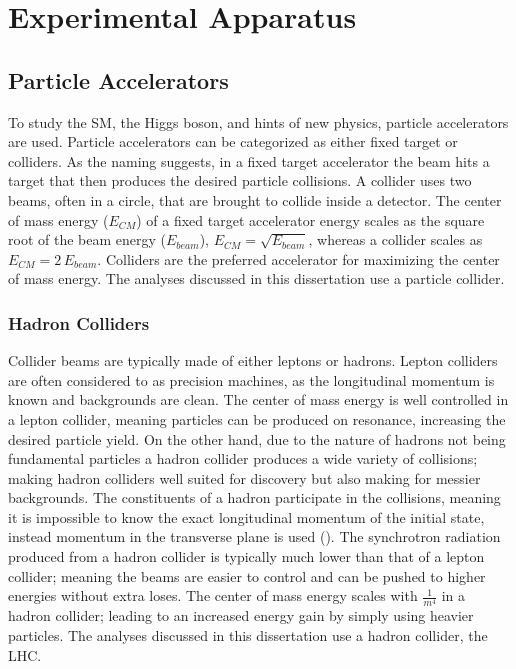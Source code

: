 \chapter{Experimental Apparatus}\label{chap:experiment}

\section{Particle Accelerators}\label{sec:accelerators}
	To study the \gls{SM}, the Higgs boson, and hints of new physics, particle accelerators are used. Particle accelerators can be categorized as either fixed target or colliders. As the naming suggests, in a fixed target accelerator the beam hits a target that then produces the desired particle collisions. A collider uses two beams, often in a circle, that are brought to collide inside a detector. The center of mass energy ($E_{CM}$) of a fixed target accelerator energy scales as the square root of the beam energy ($E_{beam}$), $E_{CM} = \sqrt{E_{beam}}$, whereas a collider scales as $E_{CM} = 2 \, E_{beam}$. Colliders are the preferred accelerator for maximizing the center of mass energy. The analyses discussed in this dissertation use a particle collider.

	\subsection{Hadron Colliders}\label{ssec:hadron-colliders}
		Collider beams are typically made of either leptons or hadrons. Lepton colliders are often considered to as precision machines, as the longitudinal momentum is known and backgrounds are clean. The center of mass energy is well controlled in a lepton collider, meaning particles can be produced on resonance, increasing the desired particle yield. On the other hand, due to the nature of hadrons not being fundamental particles a hadron collider produces a wide variety of collisions; making hadron colliders well suited for discovery but also making for messier backgrounds. The constituents of a hadron participate in the collisions, meaning it is impossible to know the exact longitudinal momentum of the initial state, instead momentum in the transverse plane is used (\pt). The synchrotron radiation produced from a hadron collider is typically much lower than that of a lepton collider; meaning the beams are easier to control and can be pushed to higher energies without extra loses. The center of mass energy scales with $\frac{1}{m^4}$ in a hadron collider; leading to an increased energy gain by simply using heavier particles. The analyses discussed in this dissertation use a hadron collider, the \acrlong{LHC}.

